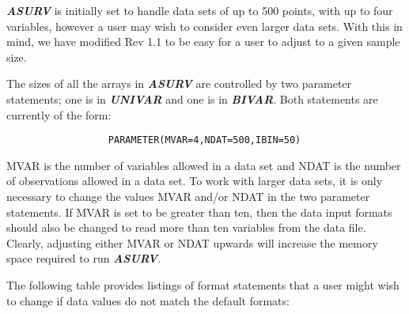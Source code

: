\bigskip
\bigskip


       {\sl\bf ASURV} is initially set to handle data sets of up to 
500 points, with up to  four variables, however a user may wish to 
consider even larger data sets.  With this in mind, we have modified 
Rev 1.1 to be easy for a user to adjust to a given sample size.

       The sizes of all the arrays in {\sl\bf ASURV} are controlled by 
two parameter statements; one is in {\sl\bf UNIVAR} and one is in 
{\sl\bf BIVAR}.  Both statements are currently of the form:

\begin{verbatim}
                  PARAMETER(MVAR=4,NDAT=500,IBIN=50)
\end{verbatim}  

MVAR is the number of variables allowed in a data set 
and NDAT is the number of observations allowed in a data set.  To work 
with larger data sets, it is only necessary to change the values MVAR and/or 
NDAT in the two parameter statements.  If MVAR is set to be greater 
than ten, then the data input formats should also be changed to read more 
than ten variables from the data file.  Clearly, adjusting either MVAR or NDAT
upwards will increase the memory space required to run {\sl\bf ASURV}.

       The following table provides listings of format statements that a user 
might wish to change if data values do not match the default formats:  

